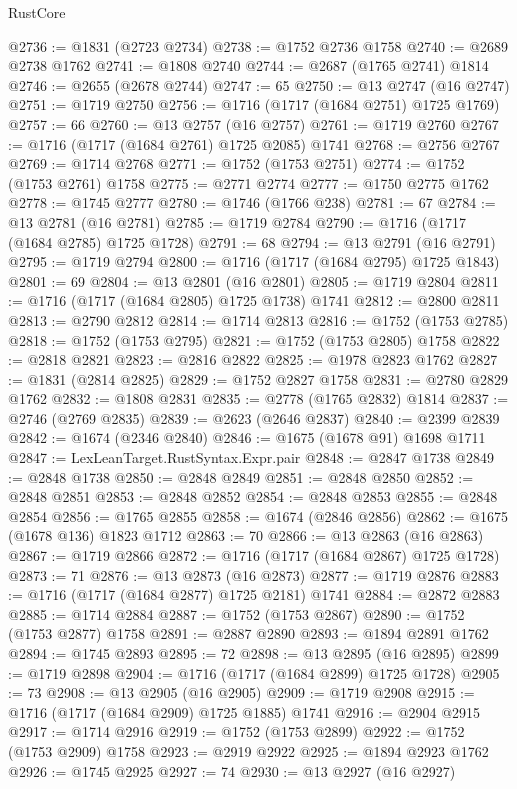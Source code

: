 \begin{lexlean}{RustCore}
\begin{coremodule}
@2736 := @1831 (@2723 @2734)
@2738 := @1752 @2736 @1758
@2740 := @2689 @2738 @1762
@2741 := @1808 @2740
@2744 := @2687 (@1765 @2741) @1814
@2746 := @2655 (@2678 @2744)
@2747 := 65
@2750 := @13 @2747 (@16 @2747)
@2751 := @1719 @2750
@2756 := @1716 (@1717 (@1684 @2751) @1725 @1769)
@2757 := 66
@2760 := @13 @2757 (@16 @2757)
@2761 := @1719 @2760
@2767 := @1716 (@1717 (@1684 @2761) @1725 @2085) @1741
@2768 := @2756 @2767
@2769 := @1714 @2768
@2771 := @1752 (@1753 @2751)
@2774 := @1752 (@1753 @2761) @1758
@2775 := @2771 @2774
@2777 := @1750 @2775 @1762
@2778 := @1745 @2777
@2780 := @1746 (@1766 @238)
@2781 := 67
@2784 := @13 @2781 (@16 @2781)
@2785 := @1719 @2784
@2790 := @1716 (@1717 (@1684 @2785) @1725 @1728)
@2791 := 68
@2794 := @13 @2791 (@16 @2791)
@2795 := @1719 @2794
@2800 := @1716 (@1717 (@1684 @2795) @1725 @1843)
@2801 := 69
@2804 := @13 @2801 (@16 @2801)
@2805 := @1719 @2804
@2811 := @1716 (@1717 (@1684 @2805) @1725 @1738) @1741
@2812 := @2800 @2811
@2813 := @2790 @2812
@2814 := @1714 @2813
@2816 := @1752 (@1753 @2785)
@2818 := @1752 (@1753 @2795)
@2821 := @1752 (@1753 @2805) @1758
@2822 := @2818 @2821
@2823 := @2816 @2822
@2825 := @1978 @2823 @1762
@2827 := @1831 (@2814 @2825)
@2829 := @1752 @2827 @1758
@2831 := @2780 @2829 @1762
@2832 := @1808 @2831
@2835 := @2778 (@1765 @2832) @1814
@2837 := @2746 (@2769 @2835)
@2839 := @2623 (@2646 @2837)
@2840 := @2399 @2839
@2842 := @1674 (@2346 @2840)
@2846 := @1675 (@1678 @91) @1698 @1711
@2847 := LexLeanTarget.RustSyntax.Expr.pair
@2848 := @2847 @1738
@2849 := @2848 @1738
@2850 := @2848 @2849
@2851 := @2848 @2850
@2852 := @2848 @2851
@2853 := @2848 @2852
@2854 := @2848 @2853
@2855 := @2848 @2854
@2856 := @1765 @2855
@2858 := @1674 (@2846 @2856)
@2862 := @1675 (@1678 @136) @1823 @1712
@2863 := 70
@2866 := @13 @2863 (@16 @2863)
@2867 := @1719 @2866
@2872 := @1716 (@1717 (@1684 @2867) @1725 @1728)
@2873 := 71
@2876 := @13 @2873 (@16 @2873)
@2877 := @1719 @2876
@2883 := @1716 (@1717 (@1684 @2877) @1725 @2181) @1741
@2884 := @2872 @2883
@2885 := @1714 @2884
@2887 := @1752 (@1753 @2867)
@2890 := @1752 (@1753 @2877) @1758
@2891 := @2887 @2890
@2893 := @1894 @2891 @1762
@2894 := @1745 @2893
@2895 := 72
@2898 := @13 @2895 (@16 @2895)
@2899 := @1719 @2898
@2904 := @1716 (@1717 (@1684 @2899) @1725 @1728)
@2905 := 73
@2908 := @13 @2905 (@16 @2905)
@2909 := @1719 @2908
@2915 := @1716 (@1717 (@1684 @2909) @1725 @1885) @1741
@2916 := @2904 @2915
@2917 := @1714 @2916
@2919 := @1752 (@1753 @2899)
@2922 := @1752 (@1753 @2909) @1758
@2923 := @2919 @2922
@2925 := @1894 @2923 @1762
@2926 := @1745 @2925
@2927 := 74
@2930 := @13 @2927 (@16 @2927)

\end{coremodule}
\end{lexlean}
